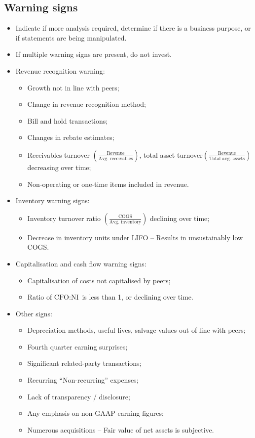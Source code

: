 \documentclass[../notes_compiled.tex]{subfiles}
\begin{document}
\subsection{Warning signs}
\begin{itemize}
\item Indicate if more analysis required, determine if there is a business purpose, or if statements are being manipulated.
\item If multiple warning signs are present, do not invest.
\item Revenue recognition warning:
\begin{itemize}
\item Growth not in line with peers;
\item Change in revenue recognition method;
\item Bill and hold transactions;
\item Changes in rebate estimates;
\item Receivables turnover $\left( \frac{\text{Revenue}}{\text{Avg. receivables}}\right)$, total asset turnover$\left( \frac{\text{Revenue}}{\text{Total avg. assets}}\right)$ decreasing over time;
\item Non-operating or one-time items included in revenue.
\end{itemize}

\item Inventory warning signs:
\begin{itemize}
\item Inventory turnover ratio $\left(\frac{\text{COGS}}{\text{Avg. inventory}}\right)$ declining over time;
\item Decrease in inventory units under LIFO -- Results in unsustainably low COGS.
\end{itemize}

\item Capitalisation and cash flow warning signs:
\begin{itemize}
\item Capitalisation of costs not capitalised by peers;
\item Ratio of $\text{CFO}:\text{NI}$ is less than 1, or declining over time.
\end{itemize}

\item Other signs:
\begin{itemize}
\item Depreciation methods, useful lives, salvage values out of line with peers;
\item Fourth quarter earning surprises;
\item Significant related-party transactions;
\item Recurring ``Non-recurring'' expenses;
\item Lack of transparency / disclosure;
\item Any emphasis on non-GAAP earning figures;
\item Numerous acquisitions -- Fair value of net assets is subjective.
\end{itemize}

\end{itemize}
\end{document}
